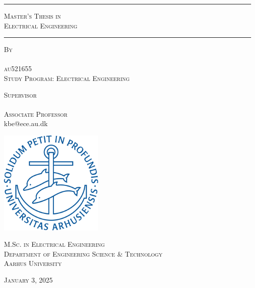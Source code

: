 \begin{titlepage}
    \centering
    \vspace*{-0.8cm}
    
    \rule{\linewidth}{0.3mm} %
    \vspace{1pt}
    {\LARGE\bfseries \ThesisTitle \par}
    \vspace{0.3cm}

    {\small\textsc{Master’s Thesis in\\
    Electrical Engineering}\par}

    \vspace{1pt}
    \rule{\linewidth}{0.3mm} %
    \vspace{0.2cm}
    
    {\small \textsc{By}\\[0.4cm]
    \normalsize \textbf{\AuthorName}\\
    \small \textsc{au521655\\
    Study Program: Electrical Engineering}\par} %
    \vspace{1cm}
    
    {\small \textsc{Supervisor}\\
    \normalsize \textbf{\SupervisorName}\\
    \small \textsc{Associate Professor}\\
    kbe@ece.au.dk\par}
    \vspace{1.5cm}

    
    \includegraphics[width=0.38\textwidth]{Logo/aulogoblue.png}\par
    \vspace{1.2cm}

    
    {\textsc{M.Sc. in Electrical Engineering\\
    Department of Engineering
    Science \& Technology\\
    Aarhus University}}\par
    \vspace{.8cm}
    
    {\normalsize \textsc{January 3, 2025}}
\end{titlepage}
